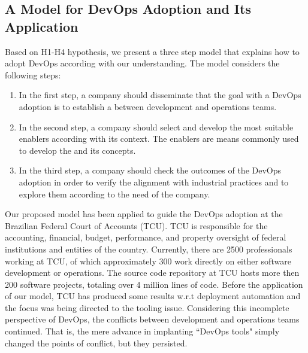 \subsection{A Model for DevOps Adoption and Its Application}\label{sec:case_study}

Based on H1-H4 hypothesis, we present a three step model that
explains how to adopt DevOps according with our understanding. The
model considers the following steps:

\begin{enumerate}
\item In the first step, a company should
disseminate that the goal with a DevOps adoption is to
establish a \cc between
development and operations teams.

\item In the second step, a company should select and develop
the most suitable enablers according with its context. The enablers
are means commonly used to develop the \cc
and its concepts.

\item In the third step, a company should check the outcomes of the
DevOps adoption in order to verify the alignment with
industrial practices and to explore them according to the
need of the company.
\end{enumerate}

Our proposed model has been applied to guide the DevOps adoption at the Brazilian Federal Court of
Accounts (TCU). TCU is responsible for the accounting, financial, budget, performance, and property
oversight of federal institutions and entities of the country. Currently, there are 2500
professionals working at TCU, of which approximately 300 work directly on either
software development or operations. The source code repository at TCU hosts more then 200 software projects, totaling
over 4 million lines of code.
Before the application of our model, TCU has produced some results w.r.t deployment
automation and the focus was being directed to the tooling issue. Considering this
incomplete perspective of DevOps, the conflicts between development and operations
teams continued. That is, the mere advance in implanting ``DevOps tools" simply
changed the points of conflict, but they persisted.

